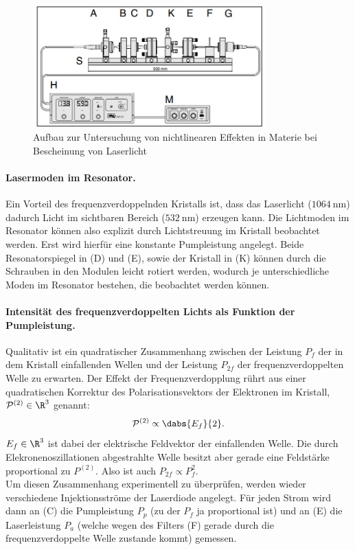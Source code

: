 \documentclass[../main.tex]{subfiles}
\begin{document}
        \begin{figure}[H]
            \centering
            \includegraphics[width=0.8\textwidth]{Bilddateien/Versuchsaufbau/Teil7.jpg}
            \caption{Aufbau zur Untersuchung von nichtlinearen Effekten in Materie bei Bescheinung von Laserlicht}
            \label{fig:Aufbau:Teil7}
        \end{figure}    

        
        \paragraph{Lasermoden im Resonator.}
            Ein Vorteil des frequenzverdoppelnden Kristalls ist, dass das Laserlicht ($\SI{1064}{\nano\m}$) dadurch Licht im sichtbaren Bereich ($\SI{532}{\nano\m}$) erzeugen kann. Die Lichtmoden im Resonator können also explizit durch Lichtstreuung im Kristall beobachtet werden. Erst wird hierfür eine konstante Pumpleistung angelegt. Beide Resonatorspiegel in (D) und (E), sowie der Kristall in (K) können durch die Schrauben in den Modulen leicht rotiert werden, wodurch je unterschiedliche Moden im Resonator bestehen, die beobachtet werden können.

        \paragraph{Intensität des frequenzverdoppelten Lichts als Funktion der Pumpleistung.}
            Qualitativ ist ein quadratischer Zusammenhang zwischen der Leistung $P_f$ der in dem Kristall einfallenden Wellen und der Leistung $P_{2f}$ der frequenzverdoppelten Welle zu erwarten. Der Effekt der Frequenzverdopplung rührt aus einer quadratischen Korrektur des Polarisationsvektors der Elektronen im Kristall, $\mathcal{P}^{(2)}\in\R^3$ genannt:
            \[
                \mathcal{P}^{(2)} \propto \dabs{E_f}{2}.
            \]
            $E_f\in\R^3$ ist dabei der elektrische Feldvektor der einfallenden Welle. Die durch Elekronenoszillationen abgestrahlte Welle besitzt aber gerade eine Feldstärke proportional zu $P^{(2)}$. Also ist auch $P_{2f}\propto P_{f}^2$.\\

            Um diesen Zusammenhang experimentell zu überprüfen, werden wieder verschiedene Injektionsströme der Laserdiode angelegt. Für jeden Strom wird dann an (C) die Pumpleistung $P_p$ (zu der $P_f$ ja proportional ist) und an (E) die Laserleistung $P_a$ (welche wegen des Filters (F) gerade durch die frequenzverdoppelte Welle zustande kommt) gemessen.
            
\end{document}
